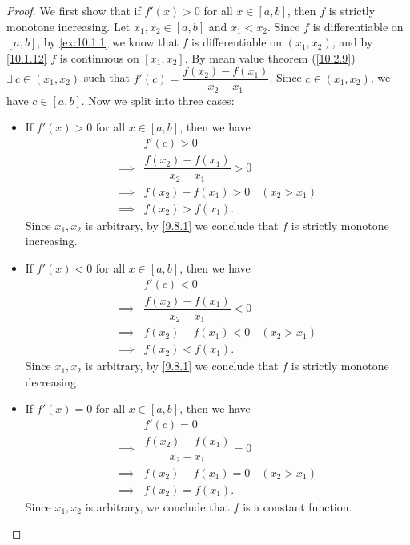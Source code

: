 \begin{proof}
  We first show that if \(f'(x) > 0\) for all \(x \in [a, b]\), then \(f\) is strictly monotone increasing.
  Let \(x_1, x_2 \in [a, b]\) and \(x_1 < x_2\).
  Since \(f\) is differentiable on \([a, b]\), by \cref{ex:10.1.1} we know that \(f\) is differentiable on \((x_1, x_2)\), and by \cref{10.1.12} \(f\) is continuous on \([x_1, x_2]\).
  By mean value theorem (\cref{10.2.9}) \(\exists\ c \in (x_1, x_2)\) such that \(f'(c) = \dfrac{f(x_2) - f(x_1)}{x_2 - x_1}\).
  Since \(c \in (x_1, x_2)\), we have \(c \in [a, b]\).
  Now we split into three cases:
  \begin{itemize}
    \item If \(f'(x) > 0\) for all \(x \in [a, b]\), then we have
          \begin{align*}
                     & f'(c) > 0                                            \\
            \implies & \dfrac{f(x_2) - f(x_1)}{x_2 - x_1} > 0               \\
            \implies & f(x_2) - f(x_1) > 0                    & (x_2 > x_1) \\
            \implies & f(x_2) > f(x_1).
          \end{align*}
          Since \(x_1, x_2\) is arbitrary, by \cref{9.8.1} we conclude that \(f\) is strictly monotone increasing.
    \item If \(f'(x) < 0\) for all \(x \in [a, b]\), then we have
          \begin{align*}
                     & f'(c) < 0                                            \\
            \implies & \dfrac{f(x_2) - f(x_1)}{x_2 - x_1} < 0               \\
            \implies & f(x_2) - f(x_1) < 0                    & (x_2 > x_1) \\
            \implies & f(x_2) < f(x_1).
          \end{align*}
          Since \(x_1, x_2\) is arbitrary, by \cref{9.8.1} we conclude that \(f\) is strictly monotone decreasing.
    \item If \(f'(x) = 0\) for all \(x \in [a, b]\), then we have
          \begin{align*}
                     & f'(c) = 0                                            \\
            \implies & \dfrac{f(x_2) - f(x_1)}{x_2 - x_1} = 0               \\
            \implies & f(x_2) - f(x_1) = 0                    & (x_2 > x_1) \\
            \implies & f(x_2) = f(x_1).
          \end{align*}
          Since \(x_1, x_2\) is arbitrary, we conclude that \(f\) is a constant function.
  \end{itemize}
\end{proof}

